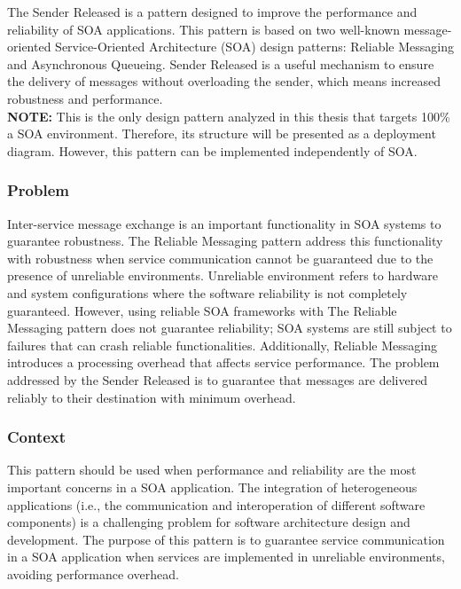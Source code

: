 The Sender Released is a pattern designed to improve the performance and reliability of SOA applications. This pattern is based on two well-known message-oriented Service-Oriented Architecture (SOA) design patterns: Reliable Messaging and Asynchronous Queueing. Sender Released is a useful mechanism to ensure the delivery of messages without overloading the sender, which means increased robustness and performance. \\

\noindent\textbf{NOTE: }This is the only design pattern analyzed in this thesis that targets 100\% a SOA environment. Therefore, its structure will be presented as a deployment diagram. However, this pattern can be implemented independently of SOA. 

\subsubsection{Problem}

Inter-service message exchange is an important functionality in SOA systems to guarantee robustness. The Reliable Messaging pattern address this functionality with robustness when service communication cannot be guaranteed due to the presence of unreliable environments. Unreliable environment refers to hardware and system configurations where the software reliability is not completely guaranteed. However, using reliable SOA frameworks with The Reliable Messaging pattern does not guarantee reliability; SOA systems are still subject to failures that can crash reliable functionalities. Additionally, Reliable Messaging introduces a processing overhead that affects service performance. The problem addressed by the Sender Released is to guarantee that messages are delivered reliably to their destination with minimum overhead.

\subsubsection{Context}

This pattern should be used when performance and reliability are the most important concerns in a SOA application. The integration of heterogeneous applications (i.e., the communication and interoperation of different software components) is a challenging problem for software architecture design and development. The purpose of this pattern is to guarantee service communication in a SOA application when services are implemented in unreliable environments, avoiding performance overhead.


